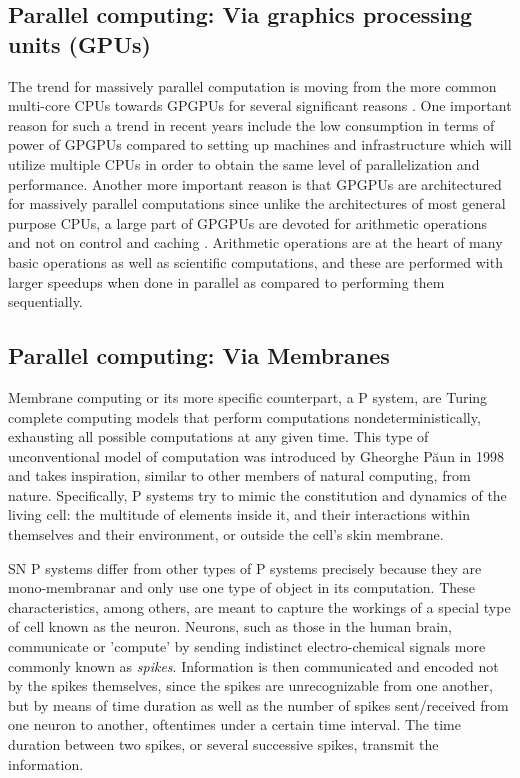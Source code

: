 \documentclass{acm_proc_article-sp}
\begin{document}
\subsection{Parallel computing: Via graphics processing units (GPUs)}
The trend for massively parallel computation is moving from the more common multi-core CPUs towards GPGPUs for several significant reasons \cite{cudabook}\cite{cudaguide}. One important reason for such a trend in recent years include the low consumption in terms of power of GPGPUs compared to setting up machines and infrastructure which will utilize multiple CPUs in order to obtain the same level of parallelization and performance\cite{cudapage}. Another more important reason is that GPGPUs are architectured for massively parallel computations since unlike the architectures of most general purpose CPUs, a large part of GPGPUs are devoted for arithmetic operations and not on control and caching \cite{cudabook}\cite{cudaguide}. Arithmetic operations are at the heart of many basic operations as well as scientific computations, and these are performed with larger speedups when done in parallel as compared to performing them sequentially. 

\subsection{Parallel computing: Via Membranes}
Membrane computing or its more specific counterpart, a P system, are Turing complete computing models that perform computations nondeterministically, exhausting all possible  computations at any given time. This type of unconventional model of computation was introduced by Gheorghe P\u aun in 1998 and takes inspiration, similar to other members of natural computing, from nature\cite{introtomem}\cite{ppage}. Specifically, P systems try to mimic the constitution and dynamics of the living cell: the multitude of elements inside it, and their interactions within themselves and their environment, or outside the cell's skin membrane.

SN P systems differ from other types of P systems precisely because they are mono-membranar and only use one type of object in its computation. These characteristics, among others, are meant to capture the workings of a special type of cell known as the neuron. Neurons, such as those in the human brain, communicate or 'compute' by sending indistinct electro-chemical  signals more commonly known as \textit{spikes}. Information is then communicated and encoded not by the spikes themselves, since the spikes are unrecognizable from one another, but by means of time duration as well as the number of spikes sent/received from one neuron to another, oftentimes under a certain time interval\cite{snp}. The time duration between two spikes, or several successive spikes, transmit the information.  
\end{document}
